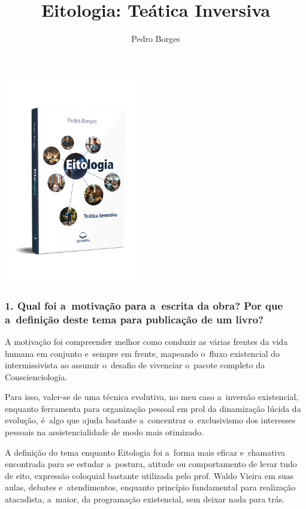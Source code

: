 \documentclass{gescons}
\author{Pedro Borges}
\title{Eitologia: Teática Inversiva}
\begin{document}
    \makeentrevistatitle

    \begin{multicols}{2}

\begin{center}
    \vspace{-1cm}
    \includegraphics[width=6cm]{articles/entrevista/mockups/Pedro_Borges}
\end{center}

\vspace{-1cm}

\subsubsection{1.       Qual foi a~motivação para a~escrita da obra? Por que a~definição deste tema para publicação de um livro?}

A motivação foi compreender melhor como conduzir as várias frentes da vida humana em conjunto e~sempre em frente, mapeando o~fluxo existencial do intermissivista ao assumir o~desafio de vivenciar o~pacote completo da Conscienciologia.

Para isso, valer-se de uma técnica evolutiva, no meu caso a~inversão existencial, enquanto ferramenta para organização pessoal em prol da dinamização lúcida da evolução, é~algo que ajuda bastante a~concentrar o~exclusivismo dos interesses pessoais na assistencialidade de modo mais otimizado.

A definição do tema enquanto Eitologia foi a~forma mais eficaz e~chamativa encontrada para se estudar a~postura, atitude ou comportamento de levar tudo de eito, expressão coloquial bastante utilizada pelo prof. Waldo Vieira em suas aulas, debates e~atendimentos, enquanto princípio fundamental para realização atacadista, a~maior, da programação existencial, sem deixar nada para trás.


\end{multicols}
\end{document}
